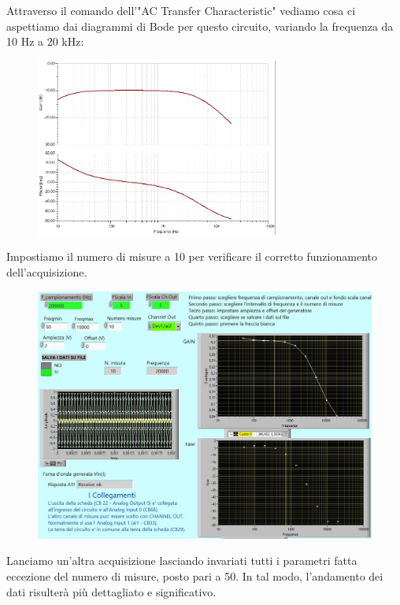 Attraverso il comando dell'"AC Transfer Characteristic" vediamo cosa ci aspettiamo dai diagrammi di Bode per questo circuito, variando la frequenza da 10 Hz a 20 kHz:
\begin{figure}[H]
\caption{}
    \includegraphics[width=8cm]{settimana_2/immagini/ImmagineCRRCBodeatteso.png}
    \centering
\end{figure}

Impostiamo il numero di misure a 10 per verificare il corretto funzionamento dell'acquisizione.

\begin{figure}[H]
\caption{}
    \includegraphics[width=12cm]{settimana_2/immagini/CRRC_1.jpg}
    \centering
\end{figure}

Lanciamo un'altra acquisizione lasciando invariati tutti i parametri fatta eccezione del numero di misure, posto pari a 50. In tal modo, l'andamento dei dati risulterà più dettagliato e significativo.



